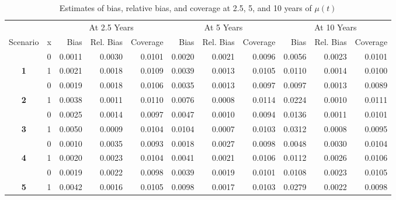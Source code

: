 \begin{table}

\caption{Estimates of bias, relative bias, and coverage at 2.5, 5, and 10 years of $\mu(t)$}
\centering
\begin{tabular}[t]{>{}ccrrrrrrrrr}
\toprule
\multicolumn{2}{c}{ } & \multicolumn{3}{c}{At 2.5 Years} & \multicolumn{3}{c}{At 5 Years} & \multicolumn{3}{c}{At 10 Years} \\
\cmidrule(l{3pt}r{3pt}){3-5} \cmidrule(l{3pt}r{3pt}){6-8} \cmidrule(l{3pt}r{3pt}){9-11}
Scenario & x & Bias & Rel. Bias & Coverage & Bias & Rel. Bias & Coverage & Bias & Rel. Bias & Coverage\\
\midrule
 & 0 & 0.0011 & 0.0030 & 0.0101 & 0.0020 & 0.0021 & 0.0096 & 0.0056 & 0.0023 & 0.0101\\

\multirow[t]{-2}{*}{\centering\arraybackslash \textbf{1}} & 1 & 0.0021 & 0.0018 & 0.0109 & 0.0039 & 0.0013 & 0.0105 & 0.0110 & 0.0014 & 0.0100\\

 & 0 & 0.0019 & 0.0018 & 0.0106 & 0.0035 & 0.0013 & 0.0097 & 0.0097 & 0.0013 & 0.0089\\

\multirow[t]{-2}{*}{\centering\arraybackslash \textbf{2}} & 1 & 0.0038 & 0.0011 & 0.0110 & 0.0076 & 0.0008 & 0.0114 & 0.0224 & 0.0010 & 0.0111\\

 & 0 & 0.0025 & 0.0014 & 0.0097 & 0.0047 & 0.0010 & 0.0094 & 0.0136 & 0.0011 & 0.0101\\

\multirow[t]{-2}{*}{\centering\arraybackslash \textbf{3}} & 1 & 0.0050 & 0.0009 & 0.0104 & 0.0104 & 0.0007 & 0.0103 & 0.0312 & 0.0008 & 0.0095\\

\rule{0pt}{4ex}
 & 0 & 0.0010 & 0.0035 & 0.0093 & 0.0018 & 0.0027 & 0.0098 & 0.0048 & 0.0030 & 0.0104\\

\multirow[t]{-2}{*}{\centering\arraybackslash \textbf{4}} & 1 & 0.0020 & 0.0023 & 0.0104 & 0.0041 & 0.0021 & 0.0106 & 0.0112 & 0.0026 & 0.0106\\

 & 0 & 0.0019 & 0.0022 & 0.0098 & 0.0039 & 0.0019 & 0.0101 & 0.0108 & 0.0023 & 0.0105\\

\multirow[t]{-2}{*}{\centering\arraybackslash \textbf{5}} & 1 & 0.0042 & 0.0016 & 0.0105 & 0.0098 & 0.0017 & 0.0103 & 0.0279 & 0.0022 & 0.0098\\


\end{tabular}
\end{table}
